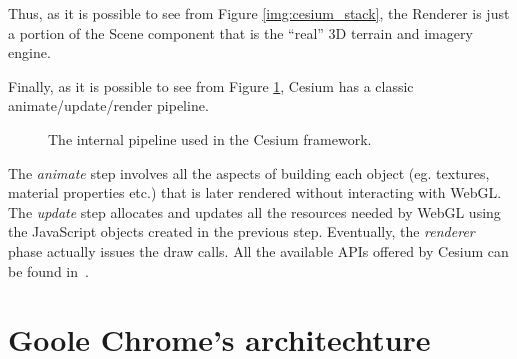 Thus, as it is possible to see from Figure \ref{img:cesium_stack},
the Renderer is just a portion of the Scene component that is the ``real'' 3D
terrain and imagery engine.

Finally, as it is possible to see from Figure \ref{img:cesium_pipeline},
Cesium has a classic animate/update/render pipeline.
\begin{figure}[!htb]
    \caption{The internal pipeline used in the Cesium framework.}
    \label{img:cesium_pipeline}
\end{figure}

The \emph{animate} step involves all the aspects of building each object (eg.
textures, material properties etc.) that is later rendered without interacting with
WebGL. The \emph{update} step allocates and updates all the resources needed by
WebGL using the JavaScript objects created in the previous step. Eventually, the
\emph{renderer} phase actually issues the draw calls. All the available APIs
offered by Cesium can be found in~\cite{cesiumapi}.


\section{Goole Chrome's architechture}

